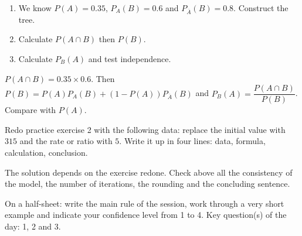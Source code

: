 \begin{exercise}[essential]
\begin{enumerate}\item We know $P(A)=\num{0,35}$, $P_A(B)=\num{0,6}$ and $P_{\overline A}(B)=\num{0,8}$. Construct the tree.\item Calculate $P(A\cap B)$ then $P(B)$.\item Calculate $P_B(A)$ and test independence.\end{enumerate}
\end{exercise}
\begin{solution}$P(A\cap B)=\num{0,35}\times\num{0,6}$. Then $P(B)=P(A)P_A(B)+(1-P(A))P_{\overline A}(B)$ and $P_B(A)=\dfrac{P(A\cap B)}{P(B)}$. Compare with $P(A)$.\end{solution}


\begin{homework}Redo practice exercise 2 with the following data: replace the initial value with $315$ and the rate or ratio with $5$. Write it up in four lines: data, formula, calculation, conclusion.\end{homework}
\begin{solution}The solution depends on the exercise redone. Check above all the consistency of the model, the number of iterations, the rounding and the concluding sentence.\end{solution}

\begin{exitticket}[3 minutes]On a half-sheet: write the main rule of the session, work through a very short example and indicate your confidence level from 1 to 4. Key question(s) of the day: 1, 2 and 3.\end{exitticket}


